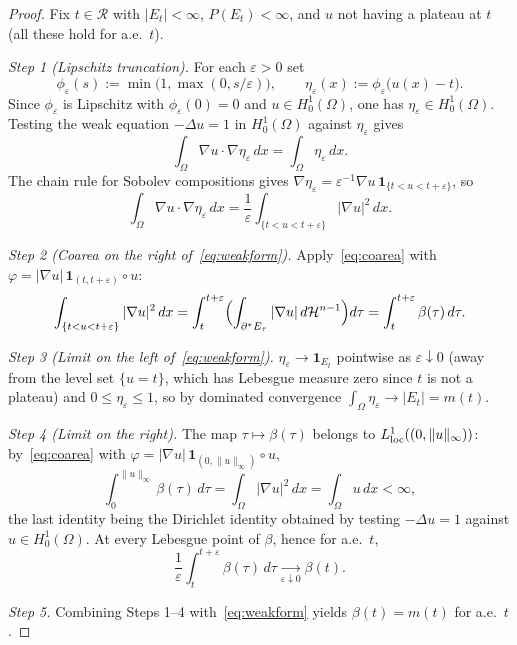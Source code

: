 \documentclass[11pt]{article}
\theoremstyle{definition}
\newcommand{\Om}{\Omega}
\newcommand{\eps}{\varepsilon}
\begin{document}
\begin{proof}
Fix $t\in\mathcal R$ with $|E_{t}|<\infty$, $P(E_{t})<\infty$, and $u$
not having a plateau at $t$ (all these hold for a.e.\ $t$).

\smallskip\noindent
\emph{Step 1 (Lipschitz truncation).}
For each $\eps>0$ set
\[
   \phi_{\eps}(s):=\min\bigl(1,\max(0,s/\eps)\bigr),
   \qquad
   \eta_{\eps}(x):=\phi_{\eps}\bigl(u(x)-t\bigr).
\]
Since $\phi_{\eps}$ is Lipschitz with $\phi_{\eps}(0)=0$ and
$u\in H^{1}_{0}(\Om)$, one has $\eta_{\eps}\in H^{1}_{0}(\Om)$. Testing
the weak equation $-\Delta u=1$ in $H^{1}_{0}(\Om)$ against $\eta_{\eps}$
gives
\begin{equation}\label{eq:weakform}
   \int_{\Om}\nabla u\cdot\nabla\eta_{\eps}\,dx
   =\int_{\Om}\eta_{\eps}\,dx.
\end{equation}
The chain rule for Sobolev compositions \cite[Thm.~3.99]{AFP2000} gives
$\nabla\eta_{\eps}=\eps^{-1}\nabla u\,\mathbf 1_{\{t<u<t+\eps\}}$, so
\[
   \int_{\Om}\nabla u\cdot\nabla\eta_{\eps}\,dx
   =\frac{1}{\eps}\int_{\{t<u<t+\eps\}}|\nabla u|^{2}\,dx.
\]

\smallskip\noindent
\emph{Step 2 (Coarea on the right of~\eqref{eq:weakform}).}
Apply~\eqref{eq:coarea} with
$\varphi=|\nabla u|\,\mathbf 1_{(t,t+\eps)}\circ u$:
\[
   \int_{\{t<u<t+\eps\}}|\nabla u|^{2}\,dx
   =\int_{t}^{t+\eps}\Bigl(\int_{\partial^{*}E_{\tau}}
      |\nabla u|\,d\mathcal H^{n-1}\Bigr)d\tau
   =\int_{t}^{t+\eps}\beta(\tau)\,d\tau.
\]

\smallskip\noindent
\emph{Step 3 (Limit on the left of~\eqref{eq:weakform}).}
$\eta_{\eps}\to\mathbf 1_{E_{t}}$ pointwise as $\eps\downarrow 0$
(away from the level set $\{u=t\}$, which has Lebesgue measure zero
since $t$ is not a plateau) and $0\le\eta_{\eps}\le 1$, so by dominated
convergence $\int_{\Om}\eta_{\eps}\to|E_{t}|=m(t)$.

\smallskip\noindent
\emph{Step 4 (Limit on the right).}
The map $\tau\mapsto\beta(\tau)$ belongs to $L^{1}_{\rm loc}((0,\|u\|_{\infty}))$:
by~\eqref{eq:coarea} with $\varphi=|\nabla u|\,\mathbf 1_{(0,\|u\|_{\infty})}\circ u$,
\[
   \int_{0}^{\|u\|_{\infty}}\beta(\tau)\,d\tau
   =\int_{\Om}|\nabla u|^{2}\,dx
   =\int_{\Om}u\,dx<\infty,
\]
the last identity being the Dirichlet identity obtained by testing
$-\Delta u=1$ against $u\in H^{1}_{0}(\Om)$. At every Lebesgue point of
$\beta$, hence for a.e.\ $t$,
\[
   \frac{1}{\eps}\int_{t}^{t+\eps}\beta(\tau)\,d\tau
   \xrightarrow[\eps\downarrow 0]{}\beta(t).
\]

\smallskip\noindent
\emph{Step 5.} Combining Steps 1--4 with~\eqref{eq:weakform} yields
$\beta(t)=m(t)$ for a.e.\ $t$.
\end{proof}
\end{document}
